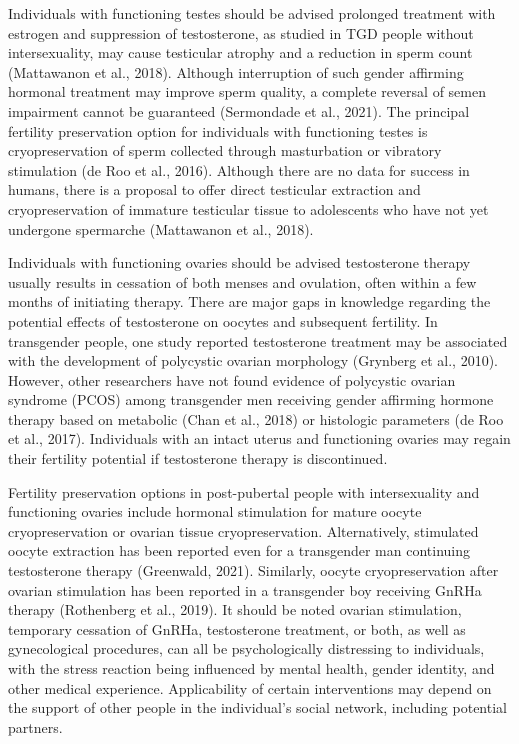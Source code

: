 \documentclass[
]{book}
\begin{document}
Individuals with functioning testes should be
advised prolonged treatment with estrogen and
suppression of testosterone, as studied in TGD
people without intersexuality, may cause testicular
atrophy and a reduction in sperm count
(Mattawanon et al., 2018). Although interruption
of such gender affirming hormonal treatment
may improve sperm quality, a complete reversal
of semen impairment cannot be guaranteed
(Sermondade et al., 2021). The principal fertility
preservation option for individuals with functioning testes is cryopreservation of sperm collected
through masturbation or vibratory stimulation
(de Roo et al., 2016). Although there are no data
for success in humans, there is a proposal to
offer direct testicular extraction and cryopreservation of immature testicular tissue to adolescents
who have not yet undergone spermarche
(Mattawanon et al., 2018).

Individuals with functioning ovaries should be
advised testosterone therapy usually results in cessation of both menses and ovulation, often within
a few months of initiating therapy. There are major
gaps in knowledge regarding the potential effects
of testosterone on oocytes and subsequent fertility.
In transgender people, one study reported testosterone treatment may be associated with the development of polycystic ovarian morphology (Grynberg
et al., 2010). However, other researchers have not
found evidence of polycystic ovarian syndrome
(PCOS) among transgender men receiving gender
affirming hormone therapy based on metabolic
(Chan et al., 2018) or histologic parameters (de
Roo et al., 2017). Individuals with an intact uterus
and functioning ovaries may regain their fertility
potential if testosterone therapy is discontinued.

Fertility preservation options in post-pubertal
people with intersexuality and functioning ovaries
include hormonal stimulation for mature oocyte
cryopreservation or ovarian tissue cryopreservation. Alternatively, stimulated oocyte extraction
has been reported even for a transgender man
continuing testosterone therapy (Greenwald,
2021). Similarly, oocyte cryopreservation after
ovarian stimulation has been reported in a transgender boy receiving GnRHa therapy (Rothenberg
et al., 2019). It should be noted ovarian stimulation, temporary cessation of GnRHa, testosterone treatment, or both, as well as gynecological
procedures, can all be psychologically distressing
to individuals, with the stress reaction being
influenced by mental health, gender identity, and
other medical experience. Applicability of certain
interventions may depend on the support of other
people in the individual's social network, including potential partners.
\end{document}

